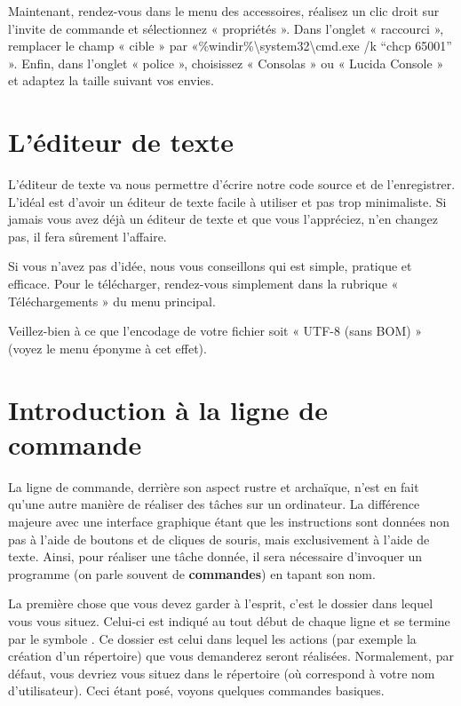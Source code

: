 Maintenant, rendez-vous dans le menu des accessoires, réalisez un clic
droit sur l'invite de commande et sélectionnez « propriétés ». Dans
l'onglet « raccourci », remplacer le champ « cible » par
«\%windir\%\textbackslash system32\textbackslash cmd.exe /k ``chcp
65001'' ». Enfin, dans l'onglet « police », choisissez « Consolas » ou
« Lucida Console » et adaptez la taille suivant vos envies.

\section{L'éditeur de texte}\label{luxe9diteur-de-texte-1}

L'éditeur de texte va nous permettre d'écrire notre code source et de
l'enregistrer. L'idéal est d'avoir un éditeur de texte facile à
utiliser et pas trop minimaliste. Si jamais vous avez déjà un éditeur
de texte et que vous l'appréciez, n'en changez pas, il fera sûrement
l'affaire.

Si vous n'avez pas d'idée, nous vous conseillons
 qui est simple,
pratique et efficace. Pour le télécharger, rendez-vous simplement dans
la rubrique « Téléchargements » du menu principal.

\begin{infobox}
 Veillez-bien à ce que l'encodage de
votre fichier soit « UTF-8 (sans BOM) » (voyez le menu éponyme à cet
effet).
\end{infobox}

\section{Introduction à la ligne de
  commande}\label{introduction-uxe0-la-ligne-de-commande-1}

La ligne de commande, derrière son aspect rustre et archaïque, n'est
en fait qu'une autre manière de réaliser des tâches sur un
ordinateur. La différence majeure avec une interface graphique étant
que les instructions sont données non pas à l'aide de boutons et de
cliques de souris, mais exclusivement à l'aide de texte. Ainsi, pour
réaliser une tâche donnée, il sera nécessaire d'invoquer un programme
(on parle souvent de \textbf{commandes}) en tapant son nom.

La première chose que vous devez garder à l'esprit, c'est le dossier
dans lequel vous vous situez. Celui-ci est indiqué au tout début de
chaque ligne et se termine par le symbole \mybox{\textgreater{}}. Ce
dossier est celui dans lequel les actions (par exemple la création
d'un répertoire) que vous demanderez seront réalisées. Normalement,
par défaut, vous devriez vous situez dans le répertoire
 (où
 correspond à votre nom d'utilisateur). Ceci étant
posé, voyons quelques commandes basiques.

